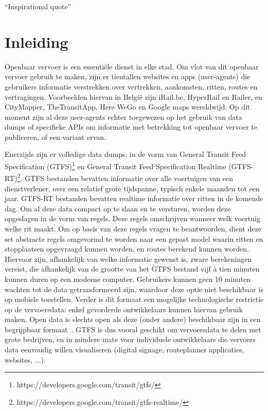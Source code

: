 \begin{savequote}[0.55\linewidth]
	``Inspirational quote''
\end{savequote}

\chapter{Inleiding}
\label{chap:intro}
Openbaar vervoer is een essentiële dienst in elke stad\citep{programmableweb14}. Om vlot van dit openbaar vervoer gebruik te maken, zijn er tientallen websites en apps (user-agents) die gebruikers informatie verstrekken over vertrekken, aankomsten, ritten, routes en vertragingen. Voorbeelden hiervan in België zijn iRail.be, HyperRail en Railer, en CityMapper, TheTransitApp, Here WeGo en Google maps wereldwijd. Op dit moment zijn al deze user-agents echter toegewezen op het gebruik van data dumps of specifieke APIs om informatie met betrekking tot openbaar vervoer te publiceren, of een variant ervan. 

Enerzijds zijn er volledige data dumps, in de vorm van General Transit Feed Specification (GTFS)\footnote{https://developers.google.com/transit/gtfs/} en General Transit Feed Specification Realtime (GTFS-RT)\footnote{https://developers.google.com/transit/gtfs-realtime/}. GTFS bestanden bevatten informatie over alle voertuigen van een dienstverlener, over een relatief grote tijdspanne, typisch enkele maanden tot een jaar. GTFS-RT bestanden bevatten realtime informatie over ritten in de komende dag. Om al deze data compact op te slaan en te versturen, worden deze opgeslagen in de vorm van regels. Deze regels omschrijven wanneer welk voertuig welke rit maakt. Om op basis van deze regels vragen te beantwoorden, dient deze set abstracte regels omgevormd te worden naar een gepast model waarin ritten en stopplaatsen opgevraagd kunnen worden, en routes berekend kunnen worden. Hiervoor zijn, afhankelijk van welke informatie gewenst is, zware berekeningen vereist, die afhankelijk van de grootte van het GTFS bestand vijf à tien minuten kunnen duren op een moderne computer. Gebruikers kunnen geen 10 minuten wachten tot de data getransformeerd zijn, waardoor deze optie niet beschikbaar is op mobiele toestellen. Verder is dit formaat een mogelijke technologische restrictie op de vervoersdata: enkel gevorderde ontwikkelaars kunnen hiervan gebruik maken. Open data is slechts open als deze (onder andere) beschikbaar zijn in een begrijpbaar formaat~\citep{okfn18}. GTFS is dus vooral geschikt om vervoersdata te delen met grote bedrijven, en in mindere mate voor individuele ontwikkelaars die vervoers data eenvoudig willen visualiseren (digital signage, routeplanner applicaties, websites, ...).

